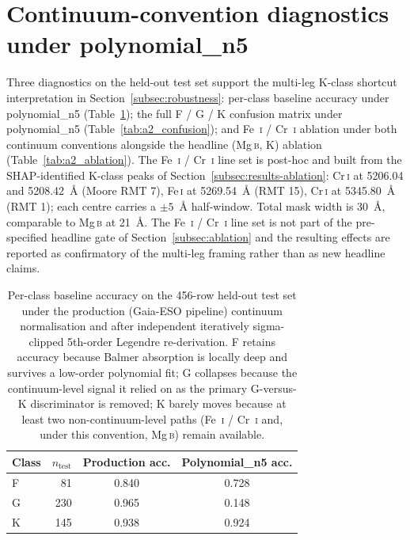 \documentclass[11pt,a4paper]{article}
\newcommand{\Mgb}{Mg\,\textsc{b}\xspace}
\newcommand{\FeI}{Fe\,\textsc{i}\xspace}
\newcommand{\CrI}{Cr\,\textsc{i}\xspace}
\begin{document}
\section{Continuum-convention diagnostics under polynomial\_n5}
\label{subapp:polynomial}

Three diagnostics on the held-out test set support the multi-leg K-class shortcut interpretation in Section~\ref{subsec:robustness}: per-class baseline accuracy under polynomial\_n5 (Table~\ref{tab:a2_baseline}); the full F / G / K confusion matrix under polynomial\_n5 (Table~\ref{tab:a2_confusion}); and Fe~\textsc{i} / Cr~\textsc{i} ablation under both continuum conventions alongside the headline (\Mgb, K) ablation (Table~\ref{tab:a2_ablation}). The Fe~\textsc{i} / Cr~\textsc{i} line set is post-hoc and built from the SHAP-identified K-class peaks of Section~\ref{subsec:results-ablation}: \CrI at 5206.04 and 5208.42~\AA{} (Moore RMT 7), \FeI at 5269.54~\AA{} (RMT 15), \CrI at 5345.80~\AA{} (RMT 1); each centre carries a $\pm 5$~\AA{} half-window. Total mask width is 30~\AA{}, comparable to \Mgb at 21~\AA{}. The Fe~\textsc{i} / Cr~\textsc{i} line set is not part of the pre-specified headline gate of Section~\ref{subsec:ablation} and the resulting effects are reported as confirmatory of the multi-leg framing rather than as new headline claims.

\begin{table}[ht]
\centering
\caption{Per-class baseline accuracy on the 456-row held-out test set under the production (Gaia-ESO pipeline) continuum normalisation and after independent iteratively sigma-clipped 5th-order Legendre re-derivation. F retains accuracy because Balmer absorption is locally deep and survives a low-order polynomial fit; G collapses because the continuum-level signal it relied on as the primary G-versus-K discriminator is removed; K barely moves because at least two non-continuum-level paths (Fe~\textsc{i} / Cr~\textsc{i} and, under this convention, \Mgb) remain available.}
\label{tab:a2_baseline}
\begin{tabular}{lrcc}
\toprule
Class & $n_{\mathrm{test}}$ & Production acc. & Polynomial\_n5 acc. \\
\midrule
F & 81  & 0.840 & 0.728 \\
G & 230 & 0.965 & 0.148 \\
K & 145 & 0.938 & 0.924 \\
\bottomrule
\end{tabular}
\end{table}
\end{document}
